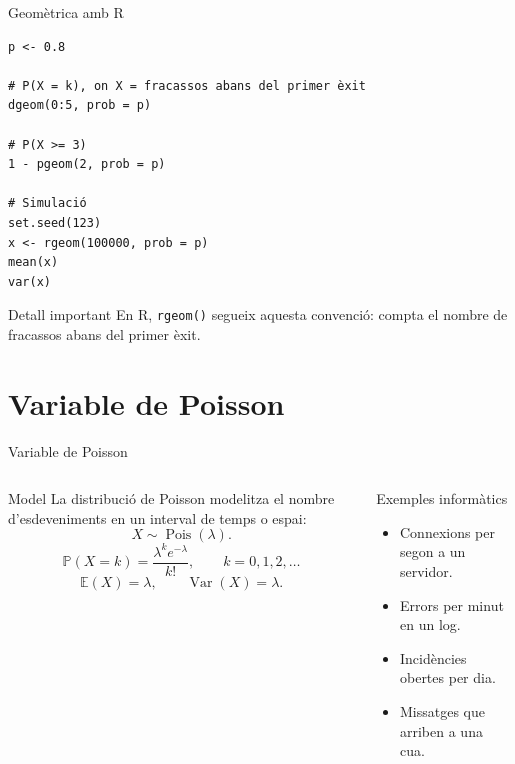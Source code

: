 \documentclass[10pt,aspectratio=169]{beamer}
\newcommand{\R}{\textsf{R}}
\newcommand{\Prob}{\mathbb{P}}
\newcommand{\E}{\mathbb{E}}
\newcommand{\Var}{\operatorname{Var}}
\begin{document}
\begin{frame}[fragile]{Geomètrica amb R}
\begin{lstlisting}
p <- 0.8

# P(X = k), on X = fracassos abans del primer èxit
dgeom(0:5, prob = p)

# P(X >= 3)
1 - pgeom(2, prob = p)

# Simulació
set.seed(123)
x <- rgeom(100000, prob = p)
mean(x)
var(x)
\end{lstlisting}

\begin{block}{Detall important}
En \R, \texttt{rgeom()} segueix aquesta convenció: compta el nombre de fracassos abans del primer èxit.
\end{block}
\end{frame}

\section{Variable de Poisson}

\begin{frame}{Variable de Poisson}
\begin{columns}[T]
\begin{block}{Model}
La distribució de Poisson modelitza el nombre d'esdeveniments en un interval de temps o espai:
\[
X\sim \operatorname{Pois}(\lambda).
\]
\[
\Prob(X=k)=\frac{\lambda^k e^{-\lambda}}{k!},\qquad k=0,1,2,\ldots
\]
\[
\E(X)=\lambda,\qquad \Var(X)=\lambda.
\]
\end{block}
\begin{block}{Exemples informàtics}
\begin{itemize}
  \item Connexions per segon a un servidor.
  \item Errors per minut en un log.
  \item Incidències obertes per dia.
  \item Missatges que arriben a una cua.
\end{itemize}
\end{block}
\end{columns}
\end{frame}
\end{document}
